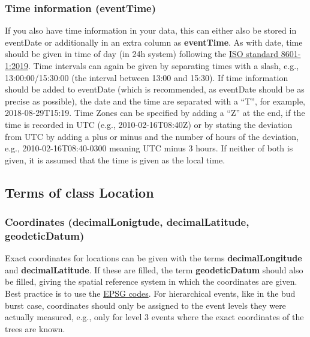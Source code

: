 \documentclass[
]{book}
\begin{document}
\hypertarget{time-information-eventtime}{%
\subsubsection{Time information (eventTime)}\label{time-information-eventtime}}

If you also have time information in your data, this can either also be stored in eventDate or additionally in an extra column as \textbf{eventTime}. As with date, time should be given in time of day (in 24h system) following the \href{https://www.iso.org/obp/ui/en/\#iso:std:iso:8601:-1:ed-1:v1:en}{ISO standard 8601-1:2019}. Time intervals can again be given by separating times with a slash, e.g., 13:00:00/15:30:00 (the interval between 13:00 and 15:30). If time information should be added to eventDate (which is recommended, as eventDate should be as precise as possible), the date and the time are separated with a ``T'', for example, 2018-08-29T15:19. Time Zones can be specified by adding a ``Z'' at the end, if the time is recorded in UTC (e.g., 2010-02-16T08:40Z) or by stating the deviation from UTC by adding a plus or minus and the number of hours of the deviation, e.g., 2010-02-16T08:40-0300 meaning UTC minus 3 hours. If neither of both is given, it is assumed that the time is given as the local time.

\hypertarget{terms-of-class-location}{%
\subsection{Terms of class Location}\label{terms-of-class-location}}

\hypertarget{coordinates-decimallonigtude-decimallatitude-geodeticdatum}{%
\subsubsection{Coordinates (decimalLonigtude, decimalLatitude, geodeticDatum)}\label{coordinates-decimallonigtude-decimallatitude-geodeticdatum}}

Exact coordinates for locations can be given with the terms \textbf{decimalLongitude} and \textbf{decimalLatitude}. If these are filled, the term \textbf{geodeticDatum} should also be filled, giving the spatial reference system in which the coordinates are given. Best practice is to use the \href{https://epsg.io/?q=\%20kind\%3AGEOGCRS}{EPSG codes}. For hierarchical events, like in the bud burst case, coordinates should only be assigned to the event levels they were actually measured, e.g., only for level 3 events where the exact coordinates of the trees are known.
\end{document}
